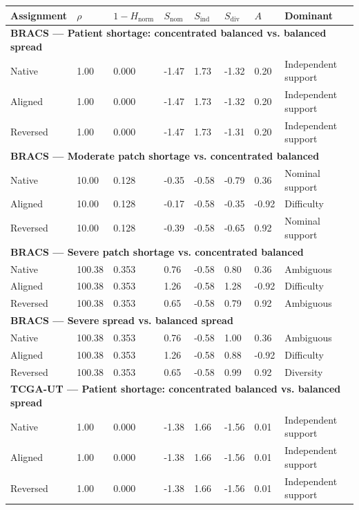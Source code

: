 \begin{tabular}{llllllll}
\toprule
Assignment & $\rho$ & $1-H_{\mathrm{norm}}$ & $S_{\mathrm{nom}}$ & $S_{\mathrm{ind}}$ & $S_{\mathrm{div}}$ & $A$ & Dominant \\
\midrule
\multicolumn{8}{l}{\textbf{BRACS --- Patient shortage: concentrated balanced vs. balanced spread}} \\
Native & 1.00 & 0.000 & -1.47 & 1.73 & -1.32 & 0.20 & Independent support \\
Aligned & 1.00 & 0.000 & -1.47 & 1.73 & -1.32 & 0.20 & Independent support \\
Reversed & 1.00 & 0.000 & -1.47 & 1.73 & -1.31 & 0.20 & Independent support \\
\midrule
\multicolumn{8}{l}{\textbf{BRACS --- Moderate patch shortage vs. concentrated balanced}} \\
Native & 10.00 & 0.128 & -0.35 & -0.58 & -0.79 & 0.36 & Nominal support \\
Aligned & 10.00 & 0.128 & -0.17 & -0.58 & -0.35 & -0.92 & Difficulty \\
Reversed & 10.00 & 0.128 & -0.39 & -0.58 & -0.65 & 0.92 & Nominal support \\
\midrule
\multicolumn{8}{l}{\textbf{BRACS --- Severe patch shortage vs. concentrated balanced}} \\
Native & 100.38 & 0.353 & 0.76 & -0.58 & 0.80 & 0.36 & Ambiguous \\
Aligned & 100.38 & 0.353 & 1.26 & -0.58 & 1.28 & -0.92 & Difficulty \\
Reversed & 100.38 & 0.353 & 0.65 & -0.58 & 0.79 & 0.92 & Ambiguous \\
\midrule
\multicolumn{8}{l}{\textbf{BRACS --- Severe spread vs. balanced spread}} \\
Native & 100.38 & 0.353 & 0.76 & -0.58 & 1.00 & 0.36 & Ambiguous \\
Aligned & 100.38 & 0.353 & 1.26 & -0.58 & 0.88 & -0.92 & Difficulty \\
Reversed & 100.38 & 0.353 & 0.65 & -0.58 & 0.99 & 0.92 & Diversity \\
\midrule
\multicolumn{8}{l}{\textbf{TCGA-UT --- Patient shortage: concentrated balanced vs. balanced spread}} \\
Native & 1.00 & 0.000 & -1.38 & 1.66 & -1.56 & 0.01 & Independent support \\
Aligned & 1.00 & 0.000 & -1.38 & 1.66 & -1.56 & 0.01 & Independent support \\
Reversed & 1.00 & 0.000 & -1.38 & 1.66 & -1.56 & 0.01 & Independent support \\

\end{tabular}
